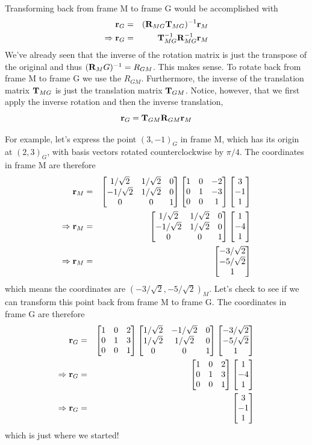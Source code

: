 \documentclass[M3_Night6_Solutions]{subfiles}
\begin{document}
\begin{enumerate}[series=exercises, label=\textbf{Exercise} (\arabic*)]
Transforming back from frame M to frame G would be accomplished with
\begin{eqnarray*}
\mathbf{r}_G &=& (\mathbf{R}_{MG} \mathbf{T}_{MG})^{-1} \mathbf{r}_M \\
\Rightarrow \mathbf{r}_G &=& \mathbf{T}_{MG}^{-1} \mathbf{R}_{MG}^{-1} \mathbf{r}_M
\end{eqnarray*}
We've already seen that the inverse of the rotation matrix is just the transpose of the original and thus $(\mathbf{R}_MG)^{-1} = R_{GM}$. This makes sense. To rotate back from frame M to frame G we use the $R_{GM}$. Furthermore, the inverse of the translation matrix $\mathbf{T}_{MG}$ is just the translation matrix $\mathbf{T}_{GM}$. Notice, however, that we first apply the inverse rotation and then the inverse translation,
\[\mathbf{r}_G = \mathbf{T}_{GM} \mathbf{R}_{GM} \mathbf{r}_M \]

For example, let's express the point $(3,-1)_G$ in frame M, which has its origin at $(2,3)_G$, with basis vectors rotated counterclockwise by $\pi/4$. The coordinates in frame M are therefore
\begin{eqnarray*}
\mathbf{r}_M &=& \begin{bmatrix} 1/\sqrt{2} & 1/\sqrt{2} & 0 \\ -1/\sqrt{2} & 1/\sqrt{2} & 0 \\ 0 & 0 & 1 \end{bmatrix} \begin{bmatrix} 1 & 0 & -2 \\ 0 & 1 & -3 \\ 0 & 0 & 1 \end{bmatrix} \begin{bmatrix} 3 \\ -1 \\ 1 \end{bmatrix} \\
\Rightarrow \mathbf{r}_M&=& \begin{bmatrix} 1/\sqrt{2} & 1/\sqrt{2} & 0 \\ -1/\sqrt{2} & 1/\sqrt{2} & 0 \\ 0 & 0 & 1 \end{bmatrix} \begin{bmatrix} 1 \\ -4 \\ 1 \end{bmatrix} \\\Rightarrow \mathbf{r}_M
&=& \begin{bmatrix} -3/\sqrt{2} \\ -5/\sqrt{2} \\ 1 \end{bmatrix}
\end{eqnarray*}
which means the coordinates are $(-3/\sqrt{2},-5/\sqrt{2})_M$. Let's check to see if we can transform this point back from frame M to frame G. The coordinates in frame G are therefore
\begin{eqnarray*}
\mathbf{r}_G &=& \begin{bmatrix} 1 & 0 & 2 \\ 0 & 1 & 3 \\ 0 & 0 & 1 \end{bmatrix}   \begin{bmatrix} 1/\sqrt{2} & -1/\sqrt{2} & 0 \\ 1/\sqrt{2} & 1/\sqrt{2} & 0 \\ 0 & 0 & 1 \end{bmatrix} \begin{bmatrix} -3/\sqrt{2} \\ -5/\sqrt{2} \\ 1 \end{bmatrix} \\
\Rightarrow \mathbf{r}_G&=& \begin{bmatrix} 1 & 0 & 2 \\ 0 & 1 & 3 \\ 0 & 0 & 1 \end{bmatrix} \begin{bmatrix} 1 \\ -4 \\ 1 \end{bmatrix} \\
\Rightarrow \mathbf{r}_G &=& \begin{bmatrix} 3 \\ -1 \\ 1 \end{bmatrix}
\end{eqnarray*}
which is just where we started!


\end{enumerate}
\end{document}
